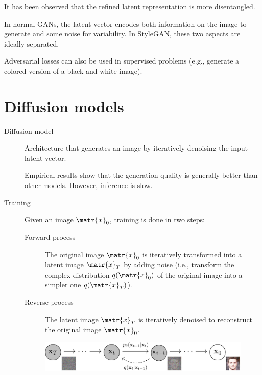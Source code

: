 \begin{description}
        \begin{remark}
            It has been observed that the refined latent representation is more disentangled.
        \end{remark}

        \begin{remark}
            In normal GANs, the latent vector encodes both information on the image to generate and some noise for variability. In StyleGAN, these two aspects are ideally separated.
        \end{remark}
\end{description}

\begin{remark}
    Adversarial losses can also be used in supervised problems (e.g., generate a colored version of a black-and-white image).
\end{remark}



\section{Diffusion models}

\def\x{\matr{x}}
\def\params{\matr{\theta}}
\def\noise{\matr{\varepsilon}}


\begin{description}
    \item[Diffusion model] 
        Architecture that generates an image by iteratively denoising the input latent vector.

        \begin{remark}
            Empirical results show that the generation quality is generally better than other models. However, inference is slow.
        \end{remark}

    \item[Training]
        Given an image $\x_0$, training is done in two steps:
        \begin{description}
            \item[Forward process] 
                The original image $\x_0$ is iteratively transformed into a latent image $\x_T$ by adding noise (i.e., transform the complex distribution $q(\x_0)$ of the original image into a simpler one $q(\x_T)$).
            \item[Reverse process] 
                The latent image $\x_T$ is iteratively denoised to reconstruct the original image $\x_0$.
        \end{description} 

        \begin{figure}[H]
            \centering
            \includegraphics[width=0.8\linewidth]{./img/diffusion_model.jpg}
        \end{figure}
\end{description}


